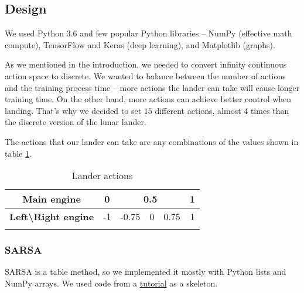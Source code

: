 \documentclass{article}
\begin{document}
	\subsection{Design}
	We used Python 3.6 and few popular Python libraries -- NumPy (effective math compute), TensorFlow and Keras (deep learning), and Matplotlib (graphs).
	
	As we mentioned in the introduction, we needed to convert infinity continuous action space to discrete. We wanted to balance between the number of actions and the training process time --  more actions the lander can take will cause longer training time. On the other hand, more actions can achieve better control when landing. That's why we decided to set $ 15 $ different actions, almost $ 4
	$ times than the discrete version of the lunar lander.
	
	The actions that our lander can take are any combinations of the values shown in table \ref{actions-table}.
	
	\begin{table}[h!]
		\centering
		\begin{tabular}{@{}cccccc@{}}
			\toprule
			\textbf{Main engine}                      & 0  & \multicolumn{3}{c}{0.5} & 1 \\ \midrule
			\textbf{Left\textbackslash{}Right engine} & -1 & -0.75    & 0   & 0.75   & 1 \\ \bottomrule \\
		\end{tabular}
		\caption{Lander actions}
		\label{actions-table}
	\end{table}
	\subsubsection{SARSA}
	SARSA is a table method, so we implemented it mostly with Python lists and NumPy arrays. We used code from a \href{https://www.geeksforgeeks.org/sarsa-reinforcement-learning/}{tutorial} \cite{sarsatutorial} as a skeleton.
	
\end{document}
